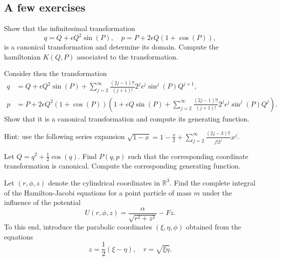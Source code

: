 \documentclass[english,fontsize=11pt,paper=a5,oneside]{scrbook}
\newcommand{\R}{\mathbb{R}}
\theoremstyle{definition}
\newenvironment{exercise}
  {\pushQED{\qed}\renewcommand{\qedsymbol}{$\maltese$}\exercisex}
  {\popQED\endexercisex}
\begin{document}
\subsection{A few exercises}
\begin{exercise}
    Show that the infinitesimal transformation
    \begin{equation}
        q = Q + \epsilon Q^2 \sin(P), \quad
        p = P + 2\epsilon Q(1+\cos(P)),
    \end{equation}
    is a canonical transformation and determine its domain.
    Compute the hamiltonian $K(Q,P)$ associated to the transformation.

    Consider then the transformation
    \begin{align}
        q &= Q + \epsilon Q^2 \sin(P) + \sum_{j=2}^\infty \frac{(2j-1)!!}{(j+1)!}2^j \epsilon^j \sin^j(P) Q^{j+1}, \\
        p &= P + 2\epsilon Q^2\left(1+\cos(P)\right)\left(
            1 + \epsilon Q \sin(P) + \sum_{j=2}^\infty \frac{(2j-1)!!}{(j+1)!}2^j \epsilon^j \sin^j(P) Q^{j}
            \right).
    \end{align}
    Show that it is a canonical transformation and compute its generating function.
    
    Hint: use the following series expansion $\sqrt{1-x} = 1 - \frac{x}{2} + \sum_{j=2}^\infty \frac{(2j-3)!!}{j! 2^j} x^j$.
\end{exercise}

\begin{exercise}
    Let $Q = q^2 + \frac12 \cos(q)$.
    Find $P(q,p)$ such that the corresponding coordinate transformation is canonical.
    Compute the corresponding generating function.
\end{exercise}

\begin{exercise}[Parabolic coordinates]
    Let $(r,\phi,z)$ denote the cylindrical coordinates in $\R^3$.
    Find the complete integral of the Hamilton-Jacobi equations for a point particle of mass $m$ under the influence of the potential
    \begin{equation}
        U(r,\phi,z) = \frac{\alpha}{\sqrt{r^2+z^2}} - F z.
    \end{equation}
    To this end, introduce the parabolic coordinates $(\xi, \eta, \phi)$ obtained from the equations
    \begin{equation}
        z = \frac 12(\xi - \eta), \quad
        r = \sqrt{\xi\eta}.
    \end{equation}
\end{exercise}
\end{document}
